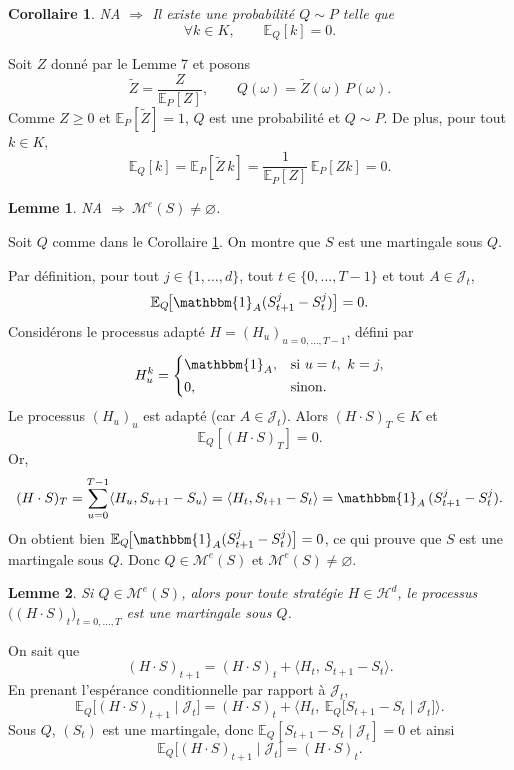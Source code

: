 \documentclass[12pt,a4paper]{article}
\makeatletter
\numberwithin{equation}{section}
\theoremstyle{plain} %
\newtheorem{lemme}{Lemme}
\newtheorem{corollaire}{Corollaire}
\theoremstyle{definition} %
\theoremstyle{remark} %
\theoremstyle{myexample}
\theoremstyle{definition}
\renewenvironment{proof}[1][\proofname]{%
  \par\vspace{0.8em}%
  \pushQED{\qed}%
  \normalfont\color{cyan}%
  \topsep6\p@\@plus6\p@\relax
  \trivlist
  \item[\hskip\labelsep\bfseries\color{cyan}#1\@addpunct{.}]\ignorespaces
}{%
  \popQED\endtrivlist\vspace{0.8em}%
}
\newcommand{\E}{\mathbb{E}}
\makeatother
\begin{document}
\begin{corollaire}\label{cor:Q}
NA $\Rightarrow$ Il existe une probabilité $Q\sim P$ telle que
\[
\forall k\in K,\qquad \E_Q[k]=0 .
\]
\end{corollaire}

\begin{proof}[Preuve du corollaire \ref{cor:Q}]
Soit $Z$ donné par le Lemme 7 et posons
\[
\widetilde Z=\frac{Z}{\E_P[Z]},
\qquad
Q(\omega)=\widetilde Z(\omega)\,P(\omega).
\]
Comme $Z\ge0$ et $\E_P[\widetilde Z]=1$, $Q$ est une probabilité et $Q\sim P$.
De plus, pour tout $k\in K$,
\[
\E_Q[k]=\E_P[\widetilde Z\,k]
=\frac{1}{\E_P[Z]}\,\E_P[Zk]=0 .
\]
\end{proof}

\begin{lemme}\label{lem:8}
NA $\Rightarrow\ \mathcal{M}^e(S)\neq\varnothing$. 
\end{lemme}

\begin{proof}[Preuve du lemme \ref{lem:8}]
Soit $Q$ comme dans le Corollaire \ref{cor:Q}. On montre que $S$ est une martingale sous $Q$.

Par définition, pour tout $j\in\{1,\dots,d\}$, tout $t\in\{0,\dots,T-1\}$ et tout
$A\in\mathcal{J}_t$,
\[
\E_Q\!\big[\mathbbm{1}_A(S_{t+1}^j-S_t^j)\big]=0 .
\]
Considérons le processus adapté $H=(H_u)_{u=0,\dots,T-1}$, défini par
\[
H_u^k=
\begin{cases}
\mathbbm{1}_A,& \text{si } u=t,\ k=j,\\[2pt]
0,& \text{sinon}.
\end{cases}
\]
Le processus $(H_u)_{u}$ est adapté (car $A\in\mathcal{J}_t$). Alors $(H\cdot S)_T\in K$ et
\[
\E_Q[(H\cdot S)_T]=0 .
\]
Or,
\[
(H\cdot S)_T
=\sum_{u=0}^{T-1}\langle H_u,S_{u+1}-S_u\rangle
=\langle H_t,S_{t+1}-S_t\rangle
=\mathbbm{1}_A\,(S_{t+1}^j-S_t^j). 
\]
On obtient bien $\E_Q\!\big[\mathbbm{1}_A(S_{t+1}^j-S_t^j)\big]=0$, ce qui prouve que $S$ est une martingale sous $Q$.
Donc $Q\in\mathcal{M}^e(S)$ et $\mathcal{M}^e(S)\neq\varnothing$.
\end{proof}

\begin{lemme}\label{lem:9}
Si $Q\in\mathcal{M}^e(S)$, alors pour toute stratégie $H\in\mathcal{H}^d$,
le processus $\big((H\cdot S)_t\big)_{t=0,\dots,T}$ est une martingale sous $Q$.
\end{lemme}

\begin{proof}[Preuve du lemme \ref{lem:9}]
On sait que
\[
(H\cdot S)_{t+1}=(H\cdot S)_t+\big\langle H_t,\,S_{t+1}-S_t\big\rangle .
\]
En prenant l’espérance conditionnelle par rapport à $\mathcal{J}_t$,
\[
\E_Q\!\big[(H\cdot S)_{t+1}\mid\mathcal{J}_t\big]
=(H\cdot S)_t+\Big\langle H_t,\ \E_Q\!\big[S_{t+1}-S_t\mid\mathcal{J}_t\big]\Big\rangle .
\]
Sous $Q$, $(S_t)$ est une martingale, donc $\E_Q[S_{t+1}-S_t\mid\mathcal{J}_t]=0$ et ainsi
\[
\E_Q\!\big[(H\cdot S)_{t+1}\mid\mathcal{J}_t\big]=(H\cdot S)_t .
\]
\end{proof}
\end{document}
